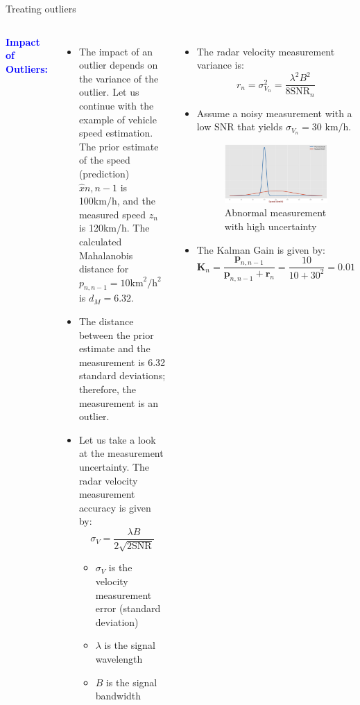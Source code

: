 \begin{frame}{Treating outliers}
\begin{columns}
    \textcolor{blue}{\textbf{Impact of Outliers:}}
    \begin{itemize}
        \item The impact of an outlier depends on the variance of the outlier. Let us continue with the example of vehicle speed estimation. The prior estimate of the speed (prediction) $\hat{x}{n,n-1}$ is 100km/h, and the measured speed $z_n$ is 120km/h. The calculated Mahalanobis distance for $p_{n,n-1} = 10 \text{km}^2/\text{h}^2$ is $d_M = 6.32$.
        \item The distance between the prior estimate and the measurement is 6.32 standard deviations; therefore, the measurement is an outlier.
        
        \item Let us take a look at the measurement uncertainty. The radar velocity measurement accuracy is given by:
        \[
        \sigma_V = \frac{\lambda B}{2 \sqrt{2 \text{SNR}}}
        \]
        \vspace{-5pt}
        \begin{itemize}
            \item \( \sigma_V \) is the velocity measurement error (standard deviation)
            \item \( \lambda \) is the signal wavelength
            \item \( B \) is the signal bandwidth
        \end{itemize}
    \end{itemize}
    \begin{itemize}
        \item The radar velocity measurement variance is:
        \[
        r_n = \sigma^2_{V_n} = \frac{\lambda^2 B^2}{8 \text{SNR}_n}
        \]
        \item Assume a noisy measurement with a low SNR that yields \( \sigma_{V_n} = 30 \text{ km/h} \).
        \begin{figure}
            \centering
            \includegraphics[width=0.35\linewidth]{Figures//Part4/AbnormalMeasurementwithHighUncertainty.png}
            \vspace{-10pt}
            \caption{Abnormal measurement with high uncertainty}
            \vspace{-10pt}
        \end{figure}
        \item The Kalman Gain is given by:
        \[
        \bm{K}_n = \frac{\bm{p}_{n,n-1}}{\bm{p}_{n,n-1} + \bm{r}_n} = \frac{10}{10 + 30^2} = 0.01
        \]


\end{itemize}
\end{columns}
\end{frame}
